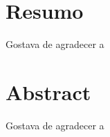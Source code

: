 \chapter*{Resumo}
Gostava de agradecer a

\null\newpage
\chapter*{Abstract}
Gostava de agradecer a

\null\newpage
